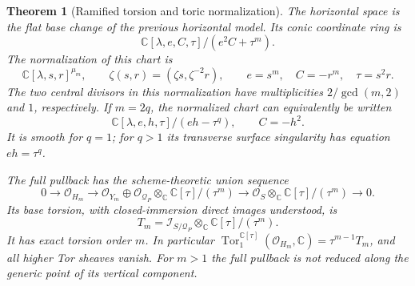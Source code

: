 \documentclass[11pt,reqno]{amsart}
\numberwithin{equation}{section}
\newtheorem{theorem}{Theorem}[section]
\theoremstyle{definition}\newtheorem{definition}[theorem]{Definition}
\theoremstyle{remark}\newtheorem{remark}[theorem]{Remark}
\newcommand{\C}{\mathbb C}\newcommand{\Q}{\mathbb Q}
\newcommand{\OO}{\mathcal O}\newcommand{\II}{\mathcal I}
\begin{document}
\begin{theorem}[Ramified torsion and toric normalization]
\label{thm:ramified-v166}
The horizontal space is the flat base change of the previous
horizontal model. Its conic coordinate ring is
\begin{equation}\label{eq:ramified-horizontal-v166}
 \C[\lambda,e,C,\tau]/(e^2C+\tau^m).
\end{equation}
The normalization of this chart is
\begin{equation}\label{eq:ramified-invariants-v166}
 \C[\lambda,s,r]^{\mu_m},\qquad
 \zeta(s,r)=(\zeta s,\zeta^{-2}r),\qquad
 e=s^m,\quad C=-r^m,\quad\tau=s^2r.
\end{equation}
The two central divisors in this normalization have multiplicities
$2/\gcd(m,2)$ and $1$, respectively. If $m=2q$, the normalized
chart can equivalently be written
\begin{equation}\label{eq:even-ramification-v166}
 \C[\lambda,e,h,\tau]/(eh-\tau^q),\qquad C=-h^2.
\end{equation}
It is smooth for $q=1$; for $q>1$ its transverse surface singularity
has equation $eh=\tau^q$.

The full pullback has the scheme-theoretic union sequence
\begin{equation}\label{eq:ramified-union-v166}
 0\to\OO_{H_m}\to\OO_{Y_m}\oplus
       \OO_{\mathcal Q_P}\otimes_\C\C[\tau]/(\tau^m)
   \to\OO_S\otimes_\C\C[\tau]/(\tau^m)\to0.
\end{equation}
Its base torsion, with closed-immersion direct images understood, is
\begin{equation}\label{eq:ramified-torsion-v166}
 T_m=\mathcal I_{S/\mathcal Q_P}\otimes_\C\C[\tau]/(\tau^m).
\end{equation}
It has exact torsion order $m$. In particular
$\operatorname{Tor}_1^{\C[\tau]}(\OO_{H_m},\C)=\tau^{m-1}T_m$,
and all higher Tor sheaves vanish. For $m>1$ the full pullback is
not reduced along the generic point of its vertical component.
\end{theorem}
\end{document}
